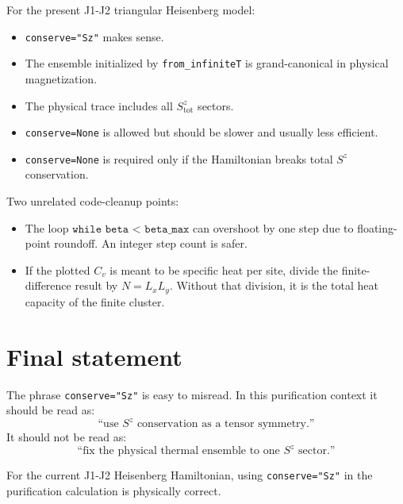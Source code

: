 \documentclass[11pt]{article}
\begin{document}
For the present J1-J2 triangular Heisenberg model:

\begin{itemize}
\item \texttt{conserve="Sz"} makes sense.
\item The ensemble initialized by \texttt{from\_infiniteT} is grand-canonical in
physical magnetization.
\item The physical trace includes all \(S^z_{\mathrm{tot}}\) sectors.
\item \texttt{conserve=None} is allowed but should be slower and usually less
efficient.
\item \texttt{conserve=None} is required only if the Hamiltonian breaks total
\(S^z\) conservation.
\end{itemize}

Two unrelated code-cleanup points:

\begin{itemize}
\item The loop \(\texttt{while beta < beta\_max}\) can overshoot by one step due
to floating-point roundoff. An integer step count is safer.
\item If the plotted \(C_v\) is meant to be specific heat per site, divide the
finite-difference result by \(N=L_xL_y\). Without that division, it is the total
heat capacity of the finite cluster.
\end{itemize}

\section*{Final statement}

The phrase \texttt{conserve="Sz"} is easy to misread. In this purification
context it should be read as:
\[
\text{``use \(S^z\) conservation as a tensor symmetry.''}
\]
It should not be read as:
\[
\text{``fix the physical thermal ensemble to one \(S^z\) sector.''}
\]

For the current J1-J2 Heisenberg Hamiltonian, using \texttt{conserve="Sz"} in
the purification calculation is physically correct.
\end{document}
